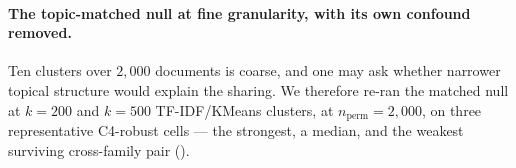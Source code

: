 \begin{table}[h]
\centering
\caption{\textbf{Length and coarse-topic nulls and random splits on all nine cells: registered run,
after submission} (original weights, published feature pipeline; ). $R$: retention
against $20$ size-matched random partitions, $n_{\text{perm}}{=}2{,}000$, every $p=1/2001$. $\Delta_E$:
consecutive-split held-out excess; no interval is reported (the registered document bootstrap is
withdrawn, ). Random split: range of held-out $\Delta_E$ over ten seeded $50/50$
splits (all $p=1/2001$); $\rho$: median of those ten over the consecutive $\Delta_E$; median $r$ over
the same splits. Q/G/M/L $=$ Qwen3/Gemma-2/Mistral/Llama-3.2, number $=$ size (B). Generated by
\texttt{code/analysis/emit\_ninecell\_table.py} from \texttt{results/ninecell\_20260926/}.}\label{tab:ninecell}
\footnotesize

\end{table}



\paragraph{The topic-matched null at fine granularity, with its own confound removed.}
Ten clusters over $2{,}000$ documents is coarse, and one may ask whether
narrower topical structure would explain the sharing. We therefore re-ran the matched null
at $k{=}200$ and $k{=}500$ TF-IDF/KMeans clusters, at $n_{\text{perm}}{=}2{,}000$, on three
representative C4-robust cells --- the strongest, a median, and the weakest surviving
cross-family pair ().

